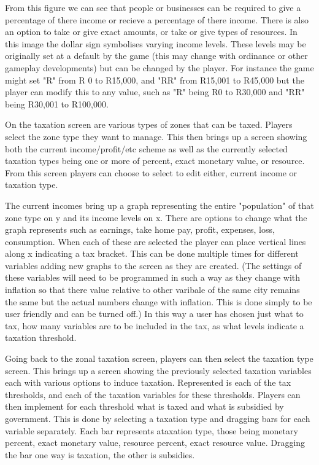 
From this figure we can see that people or businesses can be required to give a percentage of there income or recieve a percentage of there income. There is also an option to take or give exact amounts, or take or give types of resources. In this image the dollar sign symbolises varying income levels. These levels may be originally set at a default by the game (this may change with ordinance or other gameplay developments) but can be changed by the player. For instance the game might set "R" from R 0 to R15,000, and "RR" from R15,001 to R45,000 but the player can modify this to any value, such as "R" being R0 to R30,000 and "RR" being R30,001 to R100,000. 

On the taxation screen are various types of zones that can be taxed. Players select the zone type they want to manage. This then brings up a screen showing both the current income/profit/etc scheme as well as the currently selected taxation types being one or more of percent, exact monetary value, or resource. 
From this screen players can choose to select to edit either, current income or taxation type.

The current incomes bring up a graph representing the entire "population" of that zone type on y and its income levels on x. There are options to change what the graph represents such as earnings, take home pay, profit, expenses, loss, consumption. When each of these are selected the player can place vertical lines along x indicating a tax bracket. This can be done multiple times for different variables adding new graphs to the screen as they are created. (The settings of these variables will need to be programmed in such a way as they change with inflation so that there value relative to other varibale of the same city remains the same but the actual numbers change with inflation. This is done simply to be user friendly and can be turned off.) In this way a user has chosen just what to tax, how many variables are to be included in the tax, as what levels indicate a taxation threshold.

Going back to the zonal taxation screen, players can then select the taxation type screen. This brings up a screen showing the previously selected taxation variables each with various options to induce taxation. Represented is each of the tax thresholds, and each of the taxation variables for these thresholds. Players can then implement for each threshold what is taxed and what is subsidied by government. This is done by selecting a taxation type and dragging bars for each variable separately. Each bar represents ataxation type, those being monetary percent, exact monetary value, resource percent, exact resource value. Dragging the bar one way is taxation, the other is subsidies.

